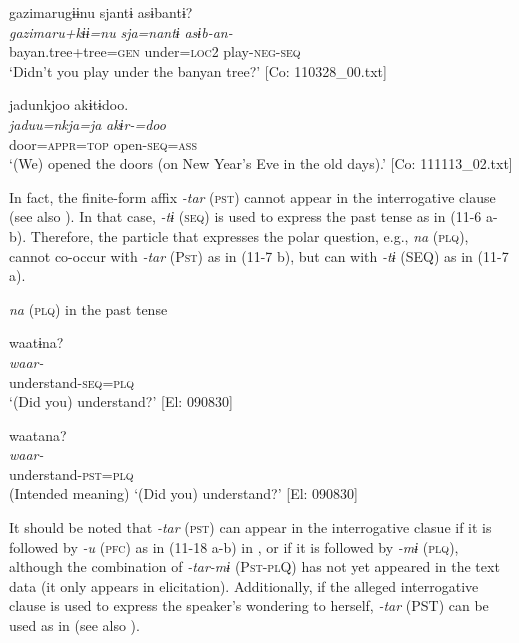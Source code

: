   \ex  
      \glll    gazimarugɨɨnu  sjantɨ  asɨbantɨ?\\
      \textit{gazimaru+kɨɨ=nu}  \textit{sja=nantɨ}  \textit{asɨb-an-}\\
      bayan.tree+tree=\textsc{gen}  under=\textsc{loc}2  play-\textsc{neg}-\textsc{seq}\\
      \glt       ‘Didn’t you play under the banyan tree?’ [Co: 110328\_00.txt]

  \ex  
      \glll    jadunkjoo  akɨtɨdoo.\\
      \textit{jaduu=nkja=ja}  \textit{akɨr-=doo}\\
      door=\textsc{appr}=\textsc{top}  open-\textsc{seq}=\textsc{ass}\\
      \glt       ‘(We) opened the doors (on New Year’s Eve in the old days).’ [Co: 111113\_02.txt]
\z
\z

  In fact, the finite-form affix \textit{{}-tar} (\textsc{pst}) cannot appear in the interrogative clause (see also ). In that case, \textit{{}-tɨ} (\textsc{seq}) is used to express the past tense as in (11-6 a-b). Therefore, the particle that expresses the polar question, e.g., \textit{na} (\textsc{plq}), cannot co-occur with \textit{{}-tar} (P\textsc{st}) as in (11-7 b), but can with \textit{{}-tɨ} (SEQ) as in (11-7 a).

\ea\label{ex:11-7}  \textit{na} (\textsc{plq}) in the past tense

  \ea  
      \glll    waatɨna?\\
      \textit{waar-}\\
      understand-\textsc{seq}=\textsc{plq}\\
      \glt       ‘(Did you) understand?’ [El: 090830]

  \ex  
      \glll    *waatana?\\
       \textit{waar-}\\
      understand-\textsc{pst}=\textsc{plq}\\
      \glt       (Intended meaning) ‘(Did you) understand?’ [El: 090830]
\z
\z

  It should be noted that \textit{{}-tar} (\textsc{pst}) can appear in the interrogative clasue if it is followed by \textit{{}-u} (\textsc{pfc}) as in (11-18 a-b) in , or if it is followed by \textit{{}-mɨ} (\textsc{plq}), although the combination of \textit{{}-tar-mɨ} (P\textsc{st}-\textsc{pl}Q) has not yet appeared in the text data (it only appears in elicitation). Additionally, if the alleged interrogative clause is used to express the speaker’s wondering to herself, \textit{{}-tar} (PST) can be used as in  (see also ).

